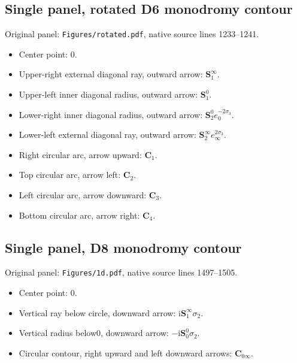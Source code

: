 \subsection*{Single panel, rotated D6 monodromy contour}
\noindent Original panel: \texttt{Figures/rotated.pdf}, native source lines 1233--1241.
\begin{itemize}\itemsep=0pt
\item Center point: $0$.
\item Upper-right external diagonal ray, outward arrow: $\mathbf{S}_1^\infty{}$.
\item Upper-left inner diagonal radius, outward arrow: $\mathbf{S}_1^0{}$.
\item Lower-right inner diagonal radius, outward arrow: $\mathbf{S}_2^0{}e_0^{-2\sigma_3}$.
\item Lower-left external diagonal ray, outward arrow: $\mathbf{S}_2^\infty{}e_\infty^{2\sigma_3}$.
\item Right circular arc, arrow upward: $\mathbf{C}_1{}$.
\item Top circular arc, arrow left: $\mathbf{C}_2{}$.
\item Left circular arc, arrow downward: $\mathbf{C}_3{}$.
\item Bottom circular arc, arrow right: $\mathbf{C}_4{}$.
\end{itemize}

\subsection*{Single panel, D8 monodromy contour}
\noindent Original panel: \texttt{Figures/1d.pdf}, native source lines 1497--1505.
\begin{itemize}\itemsep=0pt
\item Center point: $0$.
\item Vertical ray below circle, downward arrow: $\mathrm{i}\mathbf{S}_1^\infty{}\sigma_2$.
\item Vertical radius below0, downward arrow: $-\mathrm{i}\mathbf{S}_0^0{}\sigma_2$.
\item Circular contour, right upward and left downward arrows: $\mathbf{C}_{0\infty}{}$.
\end{itemize}

